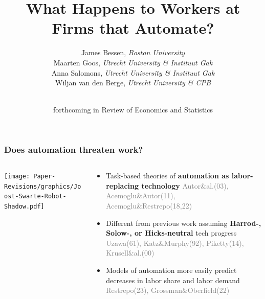 \documentclass[aspectratio=169]{beamer}
\title{\color{blue}
{\huge What Happens to Workers at Firms that Automate?}}
\author{
James Bessen, \textit{Boston University} \\
Maarten Goos, \textit{Utrecht University \& Instituut Gak} \\
Anna Salomons, \textit{Utrecht University \& Instituut Gak} \\
Wiljan van den Berge, \textit{Utrecht University \& CPB} \\
\\
}
\date{forthcoming in Review of Economics and Statistics}
\begin{document}
{
\begin{frame}
\maketitle
{}
\end{frame}
}


\begin{frame}
\frametitle{Does automation threaten work?}
\begin{columns}
\begin{column}{0.5\textwidth}  %
    \begin{center}
     \texttt{[image: Paper-Revisions/graphics/Joost-Swarte-Robot-Shadow.pdf]}
     \end{center}
\end{column}
\begin{column}{0.5\textwidth}
   \begin{itemize}
       \item<1-> Task-based theories of \textbf{automation as labor-replacing technology} \textcolor{gray}{\scriptsize{Autor\&al.(03), Acemoglu\&Autor(11), Acemoglu\&Restrepo(18,22)}}\medskip
       \item<2-> Different from previous work assuming \textbf{Harrod-, Solow-, or Hicks-neutral} tech progress \textcolor{gray}{\scriptsize{Uzawa(61), Katz\&Murphy(92), Piketty(14), Krusell\&al.(00)}}\medskip
       \item<3-> Models of automation more easily predict decreases in labor share and labor demand \textcolor{gray}{\scriptsize{Restrepo(23), Grossman\&Oberfield(22)}}
   \end{itemize}
\end{column}
\end{columns}
\end{frame}
\end{document}
